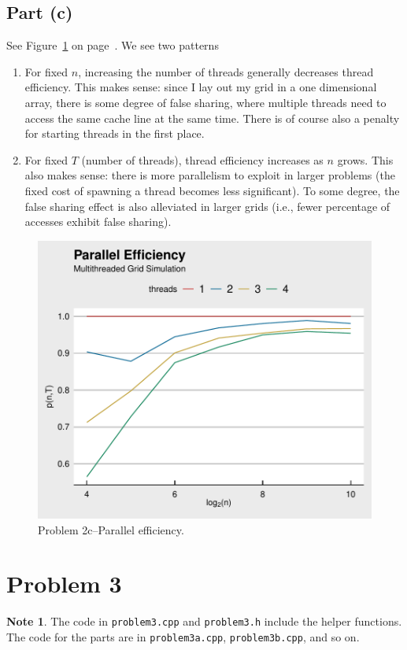 \documentclass{article}
\theoremstyle{definition}
\newtheorem*{note}{Note}
\begin{document}
\subsection{Part (c)}
See Figure~\ref{2c} on page~\pageref{2c}. We see two patterns
\begin{enumerate}
\item For fixed $n$, increasing the number of threads generally
decreases thread efficiency. This makes sense: since I lay out my grid
in a one dimensional array, there is some degree of false sharing,
where multiple threads need to access the same cache line at the same time.
There is of course also a penalty for starting threads in the first place.

\item For fixed $T$ (number of threads), thread efficiency increases
as $n$ grows. This also makes sense: there is more parallelism to exploit
in larger problems (the fixed cost of spawning a thread becomes less significant).
To some degree, the false sharing effect is also alleviated in larger grids
(i.e., fewer percentage of accesses exhibit false sharing).

\end{enumerate}
\begin{figure}
  \centering
  \includegraphics{p2}
\caption{Problem 2c--Parallel efficiency.}
\label{2c}
\end{figure}

\section{Problem 3}
\begin{note}
The code in \texttt{problem3.cpp} and \texttt{problem3.h}
include the helper functions. The code for the parts are in
\texttt{problem3a.cpp}, \texttt{problem3b.cpp}, and so on.
\end{note}
\end{document}
